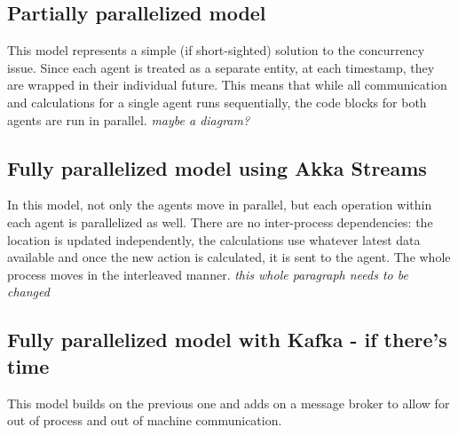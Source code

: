 \documentclass{article}
\begin{document}
\subsection{Partially parallelized model}
This model represents a simple (if short-sighted) solution to the concurrency issue. Since each agent is treated as a separate entity, at each timestamp, they are wrapped in their individual future. This means that while all communication and calculations for a single agent runs sequentially, the code blocks for both agents are run in parallel. \emph{maybe a diagram?}

\subsection{Fully parallelized model using Akka Streams}
In this model, not only the agents move in parallel, but each operation within each agent is parallelized as well. There are no inter-process dependencies: the location is updated independently, the calculations use whatever latest data available and once the new action is calculated, it is sent to the agent. The whole process moves in the interleaved manner. \emph{this whole paragraph needs to be changed}

\subsection{Fully parallelized model with Kafka - if there's time}
This model builds on the previous one and adds on a message broker to allow for out of process and out of machine communication. 
\end{document}
